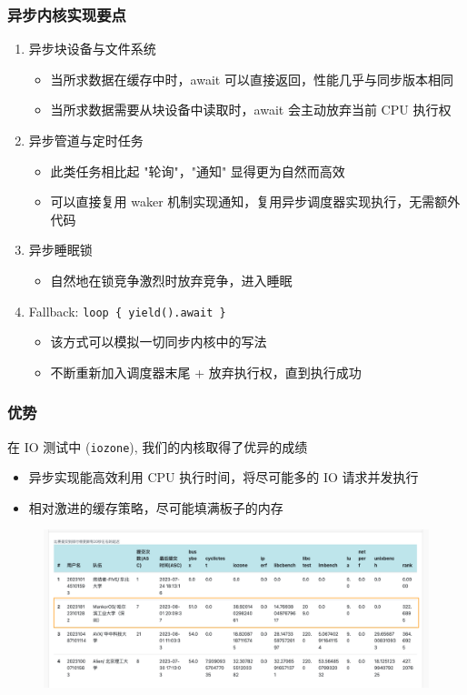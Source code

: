 \begin{frame}
    \frametitle{异步内核实现要点}

    \begin{enumerate}
        \item 异步块设备与文件系统
              \begin{itemize}
                  \item 当所求数据在缓存中时，await 可以直接返回，性能几乎与同步版本相同
                  \item 当所求数据需要从块设备中读取时，await 会主动放弃当前 CPU 执行权
              \end{itemize}
        \item 异步管道与定时任务
              \begin{itemize}
                  \item 此类任务相比起 "轮询"，"通知" 显得更为自然而高效
                  \item 可以直接复用 waker 机制实现通知，复用异步调度器实现执行，无需额外代码
              \end{itemize}
        \item 异步睡眠锁
              \begin{itemize}
                  \item 自然地在锁竞争激烈时放弃竞争，进入睡眠
              \end{itemize}
        \item Fallback: \texttt{loop \{ yield().await \}}
              \begin{itemize}
                  \item 该方式可以模拟一切同步内核中的写法
                  \item 不断重新加入调度器末尾 + 放弃执行权，直到执行成功
              \end{itemize}
    \end{enumerate}
\end{frame}

\begin{frame}
    \frametitle{优势}

    在 IO 测试中 (\texttt{iozone}), 我们的内核取得了优异的成绩
    \begin{itemize}
        \item 异步实现能高效利用 CPU 执行时间，将尽可能多的 IO 请求并发执行
        \item 相对激进的缓存策略，尽可能填满板子的内存
    \end{itemize}

    \begin{figure}
        \includegraphics[width=.75\textwidth]{assets/leaderboard-final1.png}
    \end{figure}
\end{frame}

